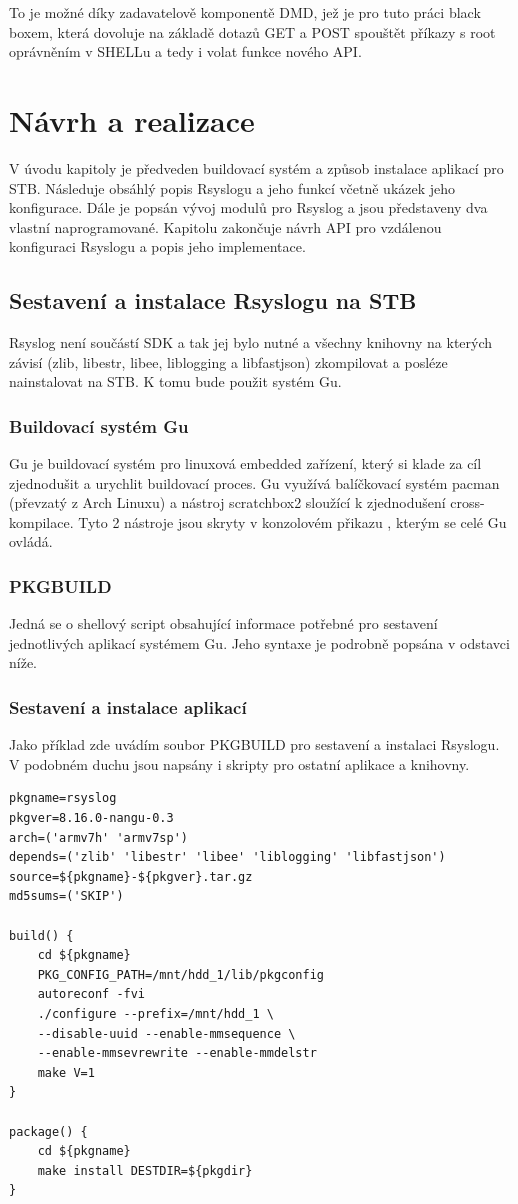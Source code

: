 \documentclass[thesis=B,czech]{FITthesis}[2012/06/26]
\begin{document}
To je možné díky zadavatelově komponentě DMD, jež je pro tuto práci black boxem, která dovoluje na základě dotazů GET a POST spouštět příkazy s root oprávněním v SHELLu a tedy i volat funkce nového API.

\chapter{Návrh a realizace}
V úvodu kapitoly je předveden buildovací systém a způsob instalace aplikací pro STB.
Následuje obsáhlý popis Rsyslogu a jeho funkcí včetně ukázek jeho konfigurace.
Dále je popsán vývoj modulů pro Rsyslog a jsou představeny dva vlastní naprogramované.
Kapitolu zakončuje návrh API pro vzdálenou konfiguraci Rsyslogu a popis jeho implementace.

\section{Sestavení a instalace Rsyslogu na STB}
Rsyslog není součástí SDK a tak jej bylo nutné a všechny knihovny na kterých závisí (zlib, libestr, libee, liblogging a libfastjson) zkompilovat a posléze nainstalovat na STB. K tomu bude použit systém Gu.

\subsection{Buildovací systém Gu}
Gu je buildovací systém pro linuxová embedded zařízení, který si klade za cíl zjednodušit a urychlit buildovací proces. Gu využívá balíčkovací systém pacman (převzatý z Arch Linuxu) a nástroj scratchbox2 sloužící k zjednodušení cross-kompilace. Tyto 2 nástroje jsou skryty v konzolovém přikazu , kterým se celé Gu ovládá.

\subsection{PKGBUILD}
Jedná se o shellový script obsahující informace potřebné pro sestavení jednotlivých aplikací systémem Gu. Jeho syntaxe je podrobně popsána v odstavci níže.

\subsection{Sestavení a instalace aplikací}
Jako příklad zde uvádím soubor PKGBUILD pro sestavení a instalaci Rsyslogu. V podobném duchu jsou napsány i skripty pro ostatní aplikace a knihovny.
\begin{lstlisting}[style=PKGBuildStyle]
pkgname=rsyslog
pkgver=8.16.0-nangu-0.3
arch=('armv7h' 'armv7sp')
depends=('zlib' 'libestr' 'libee' 'liblogging' 'libfastjson')
source=${pkgname}-${pkgver}.tar.gz
md5sums=('SKIP')

build() {
	cd ${pkgname}
	PKG_CONFIG_PATH=/mnt/hdd_1/lib/pkgconfig
	autoreconf -fvi
	./configure --prefix=/mnt/hdd_1 \
	--disable-uuid --enable-mmsequence \
	--enable-mmsevrewrite --enable-mmdelstr
	make V=1
}

package() {
	cd ${pkgname}
	make install DESTDIR=${pkgdir}
}
\end{lstlisting}
\end{document}
